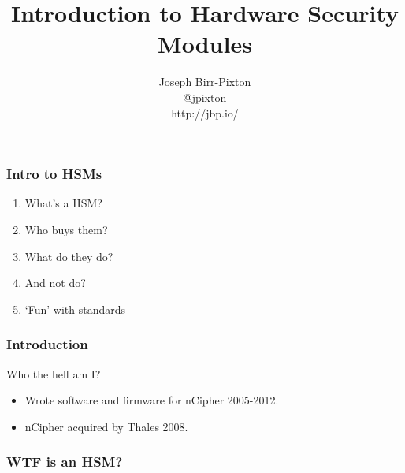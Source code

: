 \documentclass{beamer}
\title[hsms]{Introduction to Hardware Security Modules}
\author{Joseph Birr-Pixton\\
@jpixton\\
http://jbp.io/}
\date{}
\begin{document}
\frame{\titlepage}

\frame
{
  \frametitle{Intro to HSMs}

  \begin{enumerate}
    \item<1> What's a HSM?
    \item<2> Who buys them?
    \item<3> What do they do?
    \item<4> And not do?
    \item<5> `Fun' with standards
  \end{enumerate}
}

\frame
{
  \frametitle{Introduction}
  Who the hell am I?

  \begin{itemize}
    \item<1->{Wrote software and firmware for nCipher 2005-2012.}
    \item<2->{nCipher acquired by Thales 2008.}
  \end{itemize}
}

\frame
{
  \frametitle{WTF is an HSM?}

}
\end{document}
